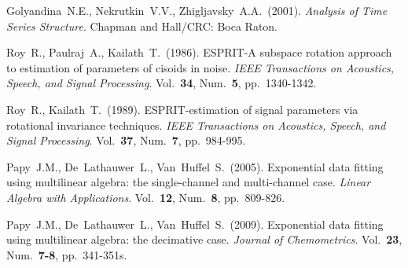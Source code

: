 \documentclass[12pt]{article}
\theoremstyle{definition}
\begin{document}
\begin{thebibliography}{10}
  Golyandina~N.E., Nekrutkin~V.V., Zhigljavsky~A.A.~(2001).
  {\sl Analysis of Time Series Structure}.
  Chapman and Hall/CRC: Boca Raton.

  Roy~R., Paulraj~A., Kailath~T.~(1986).
  ESPRIT-A subspace rotation approach to estimation of parameters of
  cisoids in noise.
  {\sl IEEE Transactions on Acoustics, Speech, and Signal Processing}.
  Vol.~{\bf 34}, Num.~{\bf 5},
  pp.~1340-1342.

  Roy~R., Kailath~T.~(1989).
  ESPRIT-estimation of signal parameters via rotational invariance techniques.
  {\sl IEEE Transactions on Acoustics, Speech, and Signal Processing}.
  Vol.~{\bf 37}, Num.~{\bf 7},
  pp.~984-995.

  Papy~J.M., De~Lathauwer~L., Van~Huffel~S.~(2005).
  Exponential data fitting using multilinear algebra: the
  single-channel and multi-channel case.
  {\sl Linear Algebra with Applications}. Vol.~{\bf 12}, Num.~{\bf 8},
  pp.~809-826.

  Papy~J.M., De~Lathauwer~L., Van~Huffel~S.~(2009).
  Exponential data fitting using multilinear algebra: the decimative case.
  {\sl Journal of Chemometrics}. Vol.~{\bf 23}, Num.~{\bf 7-8},
  pp.~341-351s.




\end{thebibliography}
\end{document}
